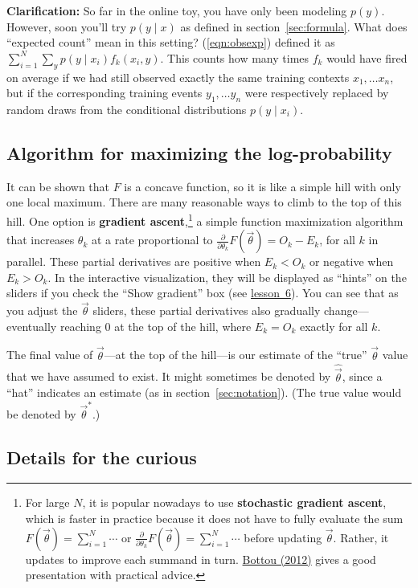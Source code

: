 \documentclass[11pt]{article}
\newcommand{\vtheta}{\vec{\theta}}
\newcommand{\diffk}{\frac{\partial}{\partial \theta_k}}
\newcommand{\lesson}[1]{\href{http://cs.jhu.edu/~jason/tutorials/loglin/\##1}{lesson~#1}}
\begin{document}
\medskip
{\bf Clarification:} So far in the online toy, you have only been
modeling $p(y)$.  However, soon you'll try $p(y\mid x)$ as
defined in section~\ref{sec:formula}.  What does ``expected count'' mean in this
setting?  (\ref{eqn:obsexp}) defined it as $\sum_{i=1}^N \sum_y
p(y\mid x_i) f_k(x_i,y)$.  This counts how many times $f_k$ would
have fired on average if we had still observed exactly the same
training contexts $x_1,\ldots x_n$, but if the corresponding training events
$y_1,\ldots y_n$ were respectively replaced by random draws from the
conditional distributions $p(y \mid x_i)$.

\subsection{Algorithm for maximizing the log-probability}

It can be shown that $F$ is a concave function, so it is like a simple hill with only one local maximum.  There are many reasonable ways to climb to the top of this hill.  One option is {\bf gradient ascent},\footnote{\label{fn:sgd}For large $N$, it is popular nowadays to use
  {\bf stochastic gradient ascent}, which is faster in practice because it does not have to fully evaluate the sum $F(\vtheta) = \sum_{i=1}^N \cdots$ or $\diffk F(\vtheta) = \sum_{i=1}^N \cdots$ before updating $\vtheta$.  Rather, it updates to improve each summand in turn.  \href{http://research.microsoft.com/pubs/192769/tricks-2012.pdf}{Bottou (2012)} gives a good presentation with practical advice.} a
simple function maximization algorithm that increases $\theta_k$ at a
rate proportional to $\diffk F(\vtheta)=O_k-E_k$, for all $k$ in parallel.
These partial derivatives are positive when $E_k < O_k$ or negative
when $E_k > O_k$.  In the interactive visualization, they will be displayed
as ``hints'' on the sliders if you check the ``Show gradient'' box (see \lesson{6}).
You can see that as you adjust the $\vtheta$ sliders, these partial derivatives 
also gradually change---eventually reaching 0 at the top of the hill, where
$E_k=O_k$ exactly for all $k$.

The final value of $\vtheta$---at the top of the hill---is our estimate of the ``true'' 
$\vtheta$ value that we have assumed to exist.  It might sometimes be
denoted by $\widehat{\vtheta}$, since a ``hat'' indicates an estimate
(as in section~\ref{sec:notation}).  (The true value would be denoted
by $\vtheta^*$.)

\subsection{Details for the curious}
\end{document}
